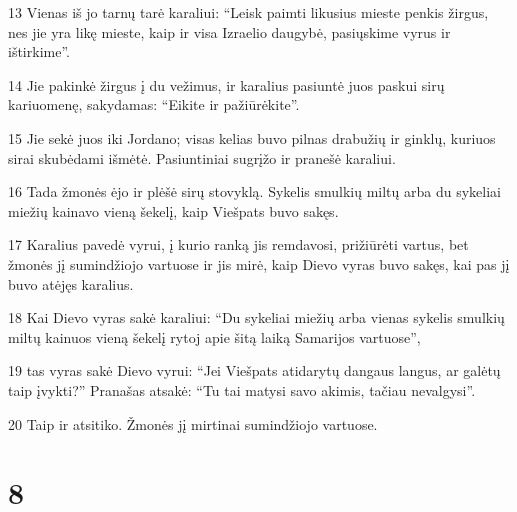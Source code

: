 \par 13 Vienas iš jo tarnų tarė karaliui: “Leisk paimti likusius mieste penkis žirgus, nes jie yra likę mieste, kaip ir visa Izraelio daugybė, pasiųskime vyrus ir ištirkime”. 
\par 14 Jie pakinkė žirgus į du vežimus, ir karalius pasiuntė juos paskui sirų kariuomenę, sakydamas: “Eikite ir pažiūrėkite”. 
\par 15 Jie sekė juos iki Jordano; visas kelias buvo pilnas drabužių ir ginklų, kuriuos sirai skubėdami išmėtė. Pasiuntiniai sugrįžo ir pranešė karaliui. 
\par 16 Tada žmonės ėjo ir plėšė sirų stovyklą. Sykelis smulkių miltų arba du sykeliai miežių kainavo vieną šekelį, kaip Viešpats buvo sakęs. 
\par 17 Karalius pavedė vyrui, į kurio ranką jis remdavosi, prižiūrėti vartus, bet žmonės jį sumindžiojo vartuose ir jis mirė, kaip Dievo vyras buvo sakęs, kai pas jį buvo atėjęs karalius. 
\par 18 Kai Dievo vyras sakė karaliui: “Du sykeliai miežių arba vienas sykelis smulkių miltų kainuos vieną šekelį rytoj apie šitą laiką Samarijos vartuose”, 
\par 19 tas vyras sakė Dievo vyrui: “Jei Viešpats atidarytų dangaus langus, ar galėtų taip įvykti?” Pranašas atsakė: “Tu tai matysi savo akimis, tačiau nevalgysi”. 
\par 20 Taip ir atsitiko. Žmonės jį mirtinai sumindžiojo vartuose.



\chapter{8}

